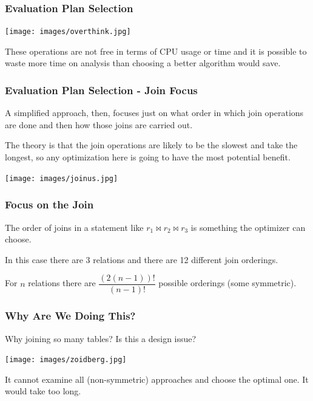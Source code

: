 \begin{frame}
\frametitle{Evaluation Plan Selection}


\begin{center}
	\texttt{[image: images/overthink.jpg]}
\end{center}

These operations are not free in terms of CPU usage or time and it is possible to waste more time on analysis than choosing a better algorithm would save. 

\end{frame}


\begin{frame}
\frametitle{Evaluation Plan Selection - Join Focus}

A simplified approach, then, focuses just on what order in which join operations are done and then how those joins are carried out. 

The theory is that the join operations are likely to be the slowest and take the longest, so any optimization here is going to have the most potential benefit.


\begin{center}
	\texttt{[image: images/joinus.jpg]}
\end{center}

\end{frame}

\begin{frame}
\frametitle{Focus on the Join}

The order of joins in a statement like $r_{1} \bowtie r_{2} \bowtie r_{3}$ is something the optimizer can choose. 

In this case there are 3 relations and there are 12 different join orderings. 

For $n$ relations there are $\dfrac{(2(n-1))!}{(n-1)!}$ possible orderings (some symmetric).


\end{frame}


\begin{frame}
\frametitle{Why Are We Doing This?}

Why joining so many tables? Is this a design issue?

\begin{center}
	\texttt{[image: images/zoidberg.jpg]}
\end{center}


It cannot examine all (non-symmetric) approaches and choose the optimal one. It would take too long.

\end{frame}


